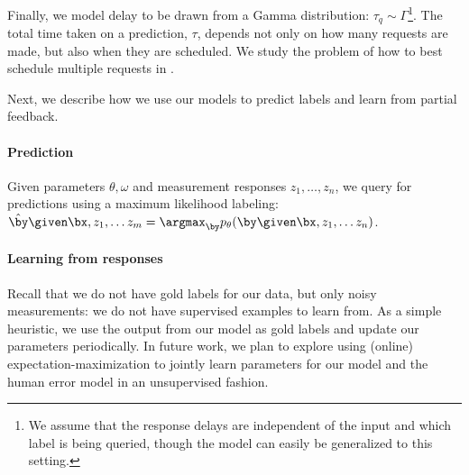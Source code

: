 Finally, we model delay to be drawn from a Gamma distribution: $\tau_q \sim \Gamma$\footnote{We assume that the response delays are independent of the input and which label is being queried, though the model can easily be generalized to this setting.}.
The total time taken on a prediction, $\tau$, depends not only on how many requests are made, but also when they are scheduled.
We study the problem of how to best schedule multiple requests in .



Next, we describe how we use our models to predict labels and learn from partial feedback.

\paragraph{Prediction}
Given parameters $\theta, \omega$ and measurement responses $z_1, \ldots, z_n$, we query for predictions using a maximum likelihood labeling:
$\byt \given \bx, z_1, \ldots z_m = \argmax_{\by} \p(\by \given \bx, z_1, \ldots z_n)$.

\paragraph{Learning from responses}

Recall that we do not have gold labels for our data, but only noisy measurements: we do not have supervised examples to learn from. 
As a simple heuristic, we use the output from our model as gold labels and update our parameters periodically.  
In future work, we plan to explore using (online) expectation-maximization to jointly learn parameters for our model and the human error model in an unsupervised fashion.
